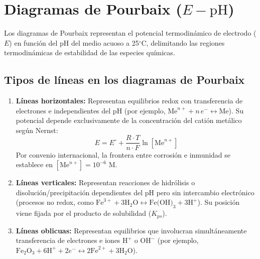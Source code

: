 \section{Diagramas de Pourbaix ($E - \text{pH}$)}

Los diagramas de Pourbaix representan el potencial termodinámico de electrodo ($E$) en función del $\text{pH}$ del medio acuoso a 25$^\circ$C, delimitando las regiones termodinámicas de estabilidad de las especies químicas.

\subsection{Tipos de líneas en los diagramas de Pourbaix}
\begin{enumerate}
    \item \textbf{Líneas horizontales:} Representan equilibrios redox con transferencia de electrones e independientes del $\text{pH}$ (por ejemplo, $\text{Me}^{n+} + n\,e^- \longleftrightarrow \text{Me}$). Su potencial depende exclusivamente de la concentración del catión metálico según Nernst:
          \begin{equation}
              E = E^\circ + \frac{R\cdot T}{n\cdot F}\ln [\text{Me}^{n+}]
          \end{equation}
          Por convenio internacional, la frontera entre corrosión e inmunidad se establece en $[\text{Me}^{n+}] = 10^{-6}\text{ M}$.
    \item \textbf{Líneas verticales:} Representan reacciones de hidrólisis o disolución/precipitación dependientes del $\text{pH}$ pero sin intercambio electrónico (procesos no redox, como $\text{Fe}^{3+} + 3\text{H}_2\text{O} \longleftrightarrow \text{Fe(OH)}_3 + 3\text{H}^+$). Su posición viene fijada por el producto de solubilidad ($K_{ps}$).
    \item \textbf{Líneas oblicuas:} Representan equilibrios que involucran simultáneamente transferencia de electrones e iones $\text{H}^+$ o $\text{OH}^-$ (por ejemplo, $\text{Fe}_2\text{O}_3 + 6\text{H}^+ + 2e^- \longleftrightarrow 2\text{Fe}^{2+} + 3\text{H}_2\text{O}$).
\end{enumerate}

